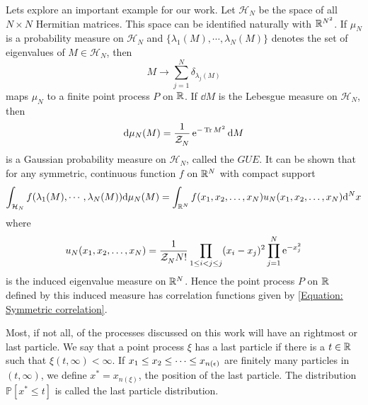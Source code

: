 Lets explore an important example for our work. Let $\mathcal{H}_N$ be the space of all $N\times N$ Hermitian matrices. This space can be identified naturally with $\mathbb{R}^{N^2}$. If $\mu_N$ is a probability measure on $\mathcal{H}_N$ and $\{\lambda_1(M), \cdots, \lambda_N(M) \}$ denotes the set of eigenvalues of $M \in \mathcal{H}_N$, then
\begin{equation}
	M \rightarrow \sum_{j=1}^{N} \delta_{\lambda_j(M)}
\end{equation}
maps $\mu_N$ to a finite point process $P$ on $\mathbb{R}$. If $\dd M$ is the Lebesgue measure on $\mathcal{H}_N$, then
\begin{equation}
	\mathrm{d} \mu_N(M) = \frac{1}{\mathcal{Z}_{N}^{}} \operatorname{e}^{-\operatorname{Tr}{M^2}} \mathrm{d} M
\end{equation}
is a Gaussian probability measure on $\mathcal{H}_N$, called the $GUE$. It can be shown that for any symmetric, continuous function $f$ on $\mathbb{R}^N$ with compact support
\begin{equation}
	\int_{\mathcal{H}_N} f(\lambda_1(M), \cdots, \lambda_N(M)) \mathrm{d} \mu_N(M) = \int_{\mathbb{R}^N} f(x_1, x_2, \dots, x_N) u_N(x_1, x_2, \dots, x_N) \mathrm{d}^N x 
\end{equation}
where
\begin{equation}
	u_N(x_1, x_2, \dots, x_N) = \frac{1}{\mathcal{Z}_{N}^{} N!} \prod_{1 \leq i < j \leq j} (x_i - x_j)^2 \prod_{j=1}^{N} \operatorname{e}^{-x^2_j}
\end{equation}
is the induced eigenvalue measure on $\mathbb{R}^N$. Hence the point process $P$ on $\mathbb{R}$ defined by this induced measure has correlation functions given by \eqref{Equation: Symmetric correlation}.

 Most, if not all, of the processes discussed on this work will have an rightmost or last particle. We say that a point process $\xi$ has a last particle if there is a $t \in \mathbb{R}$ such that $\xi(t, \infty) < \infty$. If $x_1 \leq x_2 \leq \dots \leq x_{{n(\epsilon)}}$ are finitely many particles in $(t, \infty)$, we define $x^* = x_{n(\xi)}$, the position of the last particle. The distribution $\mathbb{P}[x^* \leq t]$ is called the last particle distribution.

